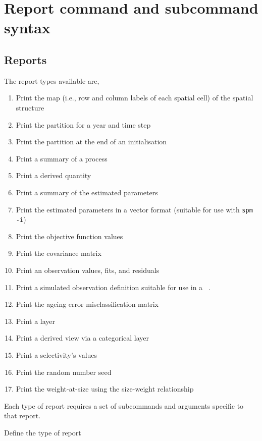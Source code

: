 \section{Report command and subcommand syntax\label{sec:report-syntax}}

\subsection{Reports}

The report types available are,

\begin{enumerate}
  \item Print the map (i.e., row and column labels of each spatial cell) of the spatial structure
  \item Print the partition for a year and time step
  \item Print the partition at the end of an initialisation
  \item Print a summary of a process
  \item Print a derived quantity
  \item Print a summary of the estimated parameters
  \item Print the estimated parameters in a vector format (suitable for use with \texttt{spm -i})
  \item Print the objective function values
  \item Print the covariance matrix
  \item Print an observation values, fits, and residuals
  \item Print a simulated observation definition suitable for use in a \SPM\ \config.
  \item Print the ageing error misclassification matrix
  \item Print a layer
  \item Print a derived view via a categorical layer
  \item Print a selectivity's values
  \item Print the random number seed
  \item Print the weight-at-size using the size-weight relationship
\end{enumerate}

Each type of report requires a set of subcommands and arguments specific to that report.


 {Define the type of report}

